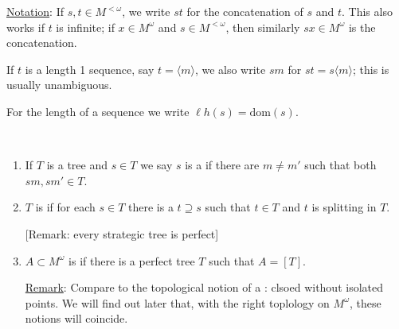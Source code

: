 \documentclass[]{article}
\newcommand{\om}{\omega}
\newcommand{\lom}{{<\omega}}
\newcommand{\lh}{\ell h}
\begin{document}
\underline{Notation}: If $s,t\in M^\lom$, we write $st$ for the concatenation of $s$ and $t$. This also works if $t$ is infinite; if $x \in M^\om$ and $s\in M^\lom$, then similarly $sx\in M^\om$ is the concatenation.

If $t$ is a length 1 sequence, say $t = \langle m\rangle$, we also write $sm$ for $st = s\langle m\rangle$; this is usually unambiguous.

For the length of a sequence we write $\lh(s) = \textrm{dom}(s)$.

\begin{defin*}\ 
    \begin{enumerate}[label=\arabic*)]
        \item If $T$ is a tree and $s \in T$ we say $s$ is a  if there are $m\ne m'$ such that both $sm,sm' \in T$.
        \item $T$ is \undf{perfect} if for each $s \in T$ there is a $t\supseteq s$ such that $t\in T$ and $t$ is splitting in $T$.
        
        [Remark: every strategic tree is perfect]

        \item $A\subset M^\om$ is  if there is a perfect tree $T$ such that $A = [T]$.
        
        \underline{Remark}: Compare to the topological notion of a : clsoed without isolated points. We will find out later that, with the right toplology on $M^\om$, these notions will coincide.

    \end{enumerate}
\end{defin*}
\end{document}
